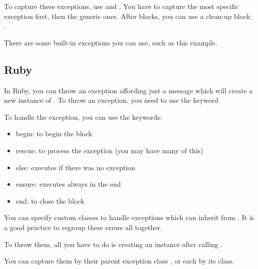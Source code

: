 \documentclass{KodeBook}
\begin{document}
To capture these exceptions, use  and . 
You have to capture the most specific exception first, then the generic ones. 
After  blocks, you can use a clean-up block: .



There are some built-in exceptions you can use, such as this example.



\subsection{Ruby}

In Ruby, you can throw an exception affording just a message which will create a new instance of . 
To throw an exception, you need to use the keyword 



To handle the exception, you can use the keywords: 
\begin{itemize}
	\item begin: to begin the block
	\item rescue: to process the exception (you may have many of this)
	\item else: executes if there was no exception
	\item ensure: executes always in the end
	\item end: to close the block
\end{itemize}



You can specify custom classes to handle exceptions which can inherit from . 
It is a good practice to regroup these errors all together.



To throw them, all you have to do is creating an instance after calling .



You can capture them by their parent exception class , or each by its class.




\ifx\wholebook\relax\else
% 
% 
	
\end{document}
